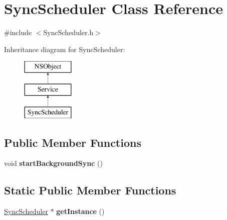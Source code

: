 \hypertarget{interface_sync_scheduler}{
\section{\-Sync\-Scheduler \-Class \-Reference}
\label{interface_sync_scheduler}
}


{\ttfamily \#include $<$\-Sync\-Scheduler.\-h$>$}

\-Inheritance diagram for \-Sync\-Scheduler\-:\begin{figure}[H]
\begin{center}
\leavevmode
\includegraphics[height=3.000000cm]{interface_sync_scheduler}
\end{center}
\end{figure}
\subsection*{\-Public \-Member \-Functions}
\begin{DoxyCompactItemize}
\item 
\hypertarget{interface_sync_scheduler_a6426a038015079a508ccafc72e754b1b}{
void {\bfseries start\-Background\-Sync} ()}
\label{interface_sync_scheduler_a6426a038015079a508ccafc72e754b1b}

\end{DoxyCompactItemize}
\subsection*{\-Static \-Public \-Member \-Functions}
\begin{DoxyCompactItemize}
\item 
\hypertarget{interface_sync_scheduler_a949dd9ba8a2e4dafa45193805b935495}{
\hyperlink{interface_sync_scheduler}{\-Sync\-Scheduler} $\ast$ {\bfseries get\-Instance} ()}
\label{interface_sync_scheduler_a949dd9ba8a2e4dafa45193805b935495}

\end{DoxyCompactItemize}


